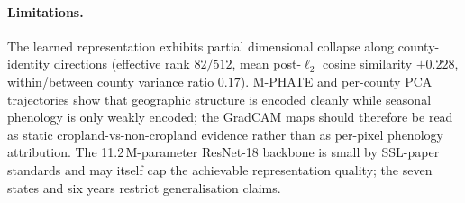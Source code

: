 \documentclass{article}
\begin{document}
\paragraph{Limitations.} The learned representation exhibits partial
dimensional collapse along county-identity directions (effective rank
$82/512$, mean post-$\ell_2$ cosine similarity $+0.228$, within/between
county variance ratio $0.17$). M-PHATE and per-county PCA trajectories show
that geographic structure is encoded cleanly while seasonal phenology is only
weakly encoded; the GradCAM maps should therefore be read as static
cropland-vs-non-cropland evidence rather than as per-pixel phenology
attribution. The 11.2\,M-parameter ResNet-18 backbone is small by SSL-paper
standards and may itself cap the achievable representation quality; the seven
states and six years restrict generalisation claims.
\end{document}
